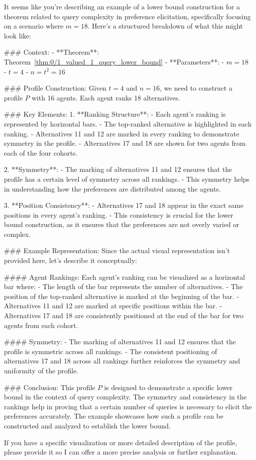 It seems like you're describing an example of a lower bound construction for a theorem related to query complexity in preference elicitation, specifically focusing on a scenario where \( m = 18 \). Here’s a structured breakdown of what this might look like:

### Context:
- **Theorem**: Theorem~\ref{thm:0/1_valued_1_query_lower_bound}
- **Parameters**:
  - \( m = 18 \)
  - \( t = 4 \)
  - \( n = t^2 = 16 \)

### Profile Construction:
Given \( t = 4 \) and \( n = 16 \), we need to construct a profile \( P \) with 16 agents. Each agent ranks 18 alternatives.

### Key Elements:
1. **Ranking Structure**:
   - Each agent's ranking is represented by horizontal bars.
   - The top-ranked alternative is highlighted in each ranking.
   - Alternatives 11 and 12 are marked in every ranking to demonstrate symmetry in the profile.
   - Alternatives 17 and 18 are shown for two agents from each of the four cohorts.

2. **Symmetry**:
   - The marking of alternatives 11 and 12 ensures that the profile has a certain level of symmetry across all rankings.
   - This symmetry helps in understanding how the preferences are distributed among the agents.

3. **Position Consistency**:
   - Alternatives 17 and 18 appear in the exact same positions in every agent's ranking.
   - This consistency is crucial for the lower bound construction, as it ensures that the preferences are not overly varied or complex.

### Example Representation:
Since the actual visual representation isn't provided here, let's describe it conceptually:

#### Agent Rankings:
Each agent's ranking can be visualized as a horizontal bar where:
- The length of the bar represents the number of alternatives.
- The position of the top-ranked alternative is marked at the beginning of the bar.
- Alternatives 11 and 12 are marked at specific positions within the bar.
- Alternatives 17 and 18 are consistently positioned at the end of the bar for two agents from each cohort.

#### Symmetry:
- The marking of alternatives 11 and 12 ensures that the profile is symmetric across all rankings.
- The consistent positioning of alternatives 17 and 18 across all rankings further reinforces the symmetry and uniformity of the profile.

### Conclusion:
This profile \( P \) is designed to demonstrate a specific lower bound in the context of query complexity. The symmetry and consistency in the rankings help in proving that a certain number of queries is necessary to elicit the preferences accurately. The example showcases how such a profile can be constructed and analyzed to establish the lower bound.

If you have a specific visualization or more detailed description of the profile, please provide it so I can offer a more precise analysis or further explanation.
